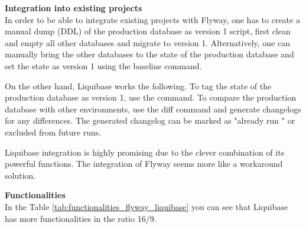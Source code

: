\textbf{Integration into existing projects}\\
In order to be able to integrate existing projects with Flyway, one has to create a manual dump (DDL) of the production database as version 1 script, first clean and empty all other databases and migrate to version 1. Alternatively, one can manually bring the other databases to the state of the production database and set the state as version 1 using the baseline command.

On the other hand, Liquibase works the following. To tag the state of the production database as version 1, use the  command. To compare the production database with other environments, use the diff command and generate changelogs for any differences. 
The generated changelog can be marked as "already run " or excluded from future runs.

Liquibase integration is highly promising due to the clever combination of its powerful functions. The integration of Flyway seems more like a workaround solution.

\textbf{Functionalities}\\
In the Table \ref{tab:functionalities_flyway_liquibase} you can see that Liquibase has more functionalities in the ratio 16/9. 



